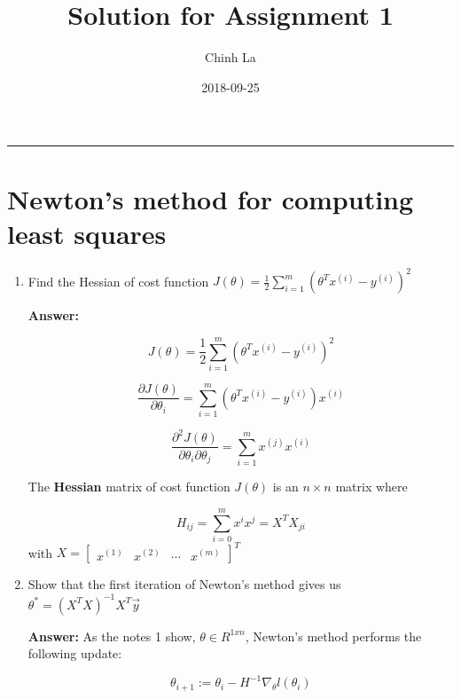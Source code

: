 \documentclass[a4paper,14pt]{article}
\title{Solution for Assignment 1}
\date{2018-09-25}
\author{Chinh La}
\begin{document}
\maketitle
{}
\noindent\rule{\textwidth}{0.5pt}
\section{Newton's method for computing least squares}
\begin{enumerate}[label=(\alph*)]
    \item Find the Hessian of cost function $J(\theta)=\frac{1}{2}\sum_{i=1}^{m} (\theta^{T}x^{(i)}-y^{(i)})^{2}$

\textbf{Answer:}

\begin{equation}
    J({\theta})=\frac{1}{2}\sum_{i=1}^{m} (\theta^{T}x^{(i)}-y^{(i)})^{2}
\end{equation}

\begin{equation}
    \frac{\partial J(\theta)}{\partial \theta_{i}} = \sum_{i=1}^{m}(\theta^{T}x^{(i)}-y^{(i)})x^{(i)}
\end{equation}

\begin{equation}
    \frac{\partial^{2} J(\theta)}{\partial \theta_{i} \partial \theta_{j}} = \sum_{i=1}^{m}x^{(j)}x^{(i)}
\end{equation}

The \textbf{Hessian} matrix of cost function $J(\theta)$ is an $n \times n$ matrix where

\begin{equation*}
    H_{ij} = \sum_{i=0}^{m}x^{i}x^{j} = X^{T}X_{ji}
\end{equation*}
with $X = \begin{bmatrix}
    x^{(1)} & x^{(2)} & \cdots & x^{(m)}
\end{bmatrix}^{T}$

    \item Show that the first iteration of Newton's method gives us $\theta^{*}=(X^{T}X)^{-1}X^{T}\vec{y}$
    
    \textbf{Answer:}
    As the notes 1 show, $\theta \in R^{1xn}$, Newton's method performs the following update:

    \begin{equation}
        \theta_{i+1} := \theta_{i} - H^{-1} \nabla_{\theta} l(\theta_{i})
    \end{equation}
    

\end{enumerate}
\end{document}
